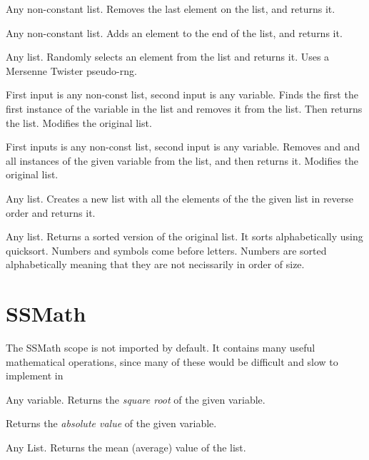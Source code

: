 \documentclass{book}
\begin{document}
{Any non-constant list.}
{Removes the last element on the list, and returns it.}
{}

{Any non-constant list.}
{Adds an element to the end of the list, and returns it.}
{}

{Any list.}
{Randomly selects an element from the list and returns it.}
{Uses a Mersenne Twister pseudo-rng.}

{First input is any non-const list, second input is any variable.}
{Finds the first the first instance of the variable in the list and removes it from the list.  Then returns the list.}
{Modifies the original list.}

{First inputs is any non-const list, second input is any variable.}
{Removes and and all instances of the given variable from the list, and then returns it.}
{Modifies the original list.}

{Any list.}
{Creates a new list with all the elements of the the given list in reverse order and returns it.}
{}

{Any list.}
{Returns a sorted version of the original list. }
{It sorts alphabetically using quicksort.  Numbers and symbols come before letters.  Numbers are sorted alphabetically meaning that they are not necissarily in order of size.}

\section{SSMath}
The SSMath scope is not imported by default.  It contains many useful mathematical operations, since many of these would be difficult and slow to implement in \SSquared{}


{Any variable.}
{Returns the \emph{square root} of the given variable.}{}

{Returns the \emph{absolute value} of the given variable.}{}

{Any List.}
{Returns the mean (average) value of the list.}{}



\end{document}
